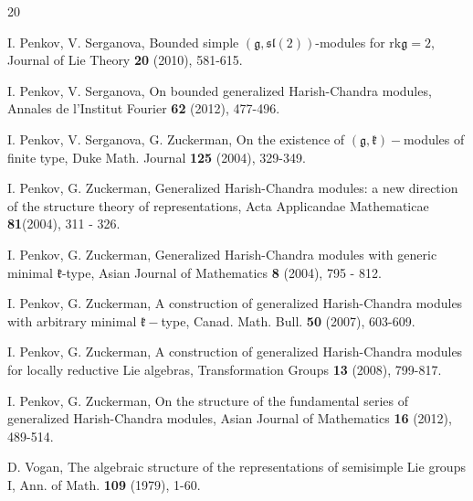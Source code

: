 \documentclass[10pt]{amsart}
\newcommand{\rk}{\mathrm{rk}}
\renewcommand{\gg}{\mathfrak{g}}
\newcommand{\kk}{\mathfrak{k}}
\renewcommand{\sl}{\mathfrak{sl}}
\begin{document}
\begin{thebibliography}{20}
\vspace{.25cm}

 I. Penkov, V. Serganova, Bounded simple $(\gg,\sl(2))$-modules for $\rk\gg = 2$, Journal of Lie Theory \textbf{20} (2010), 581-615.

\vspace{.25cm}

 I. Penkov, V. Serganova, On bounded generalized Harish-Chandra modules, Annales de l'Institut Fourier \textbf{62} (2012), 477-496.

\vspace{.25cm}

 I. Penkov, V. Serganova, G. Zuckerman, On the existence of $(\gg,\kk)-$modules of finite type, Duke Math. Journal \textbf{125} (2004), 329-349.

\vspace{.25cm}

 I. Penkov, G. Zuckerman, Generalized Harish-Chandra modules: a new direction of the structure theory of representations, Acta Applicandae Mathematicae \textbf{81}(2004), 311 - 326.

\vspace{.25cm}

 I. Penkov, G. Zuckerman, Generalized Harish-Chandra modules with generic minimal $\kk$-type, Asian Journal of Mathematics \textbf{8} (2004), 795 - 812.

\vspace{.25cm}

 I. Penkov, G. Zuckerman, A construction of generalized Harish-Chandra modules with arbitrary minimal $\kk-$type, Canad. Math. Bull. \textbf{50} (2007), 603-609.

\vspace{.25cm}

 I. Penkov, G. Zuckerman, A construction of generalized Harish-Chandra modules for locally reductive Lie algebras, Transformation Groups \textbf{13} (2008), 799-817.

\vspace{.25cm}

 I. Penkov, G. Zuckerman, On the structure of the fundamental series of generalized Harish-Chandra modules, Asian Journal of Mathematics \textbf{16} (2012), 489-514.

\vspace{.25cm}

 D. Vogan, The algebraic structure of the representations of semisimple Lie groups I, Ann. of Math. \textbf{109} (1979), 1-60.


\end{thebibliography}
\end{document}
